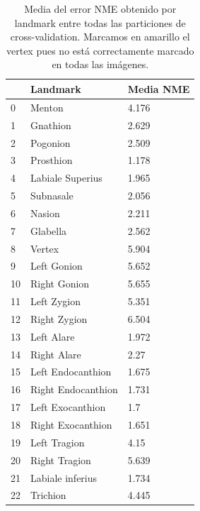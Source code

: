         \begin{table}[!ht]
            \centering
            \caption{Media del error NME obtenido por landmark entre todas las particiones de cross-validation. Marcamos en amarillo el vertex pues no está correctamente marcado en todas las imágenes.}
            \begin{tabular}{|l|l|l|}
            \hline
                ~ & \cellcolor{gray!25}\textbf{Landmark} & \cellcolor{gray!25}\textbf{Media NME} \\ \hline
                0 & Menton & 4.176 \\ \hline
                1 & Gnathion & 2.629 \\ \hline
                2 & Pogonion & 2.509 \\ \hline
                3 & Prosthion & 1.178 \\ \hline
                4 & Labiale Superius & 1.965 \\ \hline
                5 & Subnasale & 2.056 \\ \hline
                6 & Nasion & 2.211 \\ \hline
                7 & Glabella & 2.562 \\ \hline
                \cellcolor{yellow!50}8 & \cellcolor{yellow!50}Vertex & \cellcolor{yellow!50}5.904 \\ \hline
                9 & Left Gonion & 5.652 \\ \hline
                10 & Right Gonion & 5.655 \\ \hline
                11 & Left Zygion & 5.351 \\ \hline
                12 & Right Zygion & 6.504 \\ \hline
                13 & Left Alare & 1.972 \\ \hline
                14 & Right Alare & 2.27 \\ \hline
                15 & Left Endocanthion & 1.675 \\ \hline
                16 & Right Endocanthion & 1.731 \\ \hline
                17 & Left Exocanthion & 1.7 \\ \hline
                18 & Right Exocanthion & 1.651 \\ \hline
                19 & Left Tragion & 4.15 \\ \hline
                20 & Right Tragion & 5.639 \\ \hline
                21 & Labiale inferius & 1.734 \\ \hline
                22 & Trichion & 4.445 \\ \hline

\end{tabular}
\end{table}
